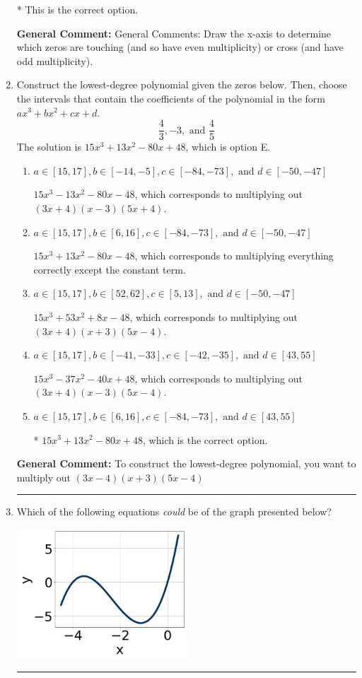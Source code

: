 \documentclass{extbook}[14pt]
\newcommand{\litem}[1]{\item #1

\rule{\textwidth}{0.4pt}}
\begin{document}
\begin{enumerate}
{\begin{enumerate}[label=\Alph*.]
* This is the correct option.
\end{enumerate}

\textbf{General Comment:} General Comments: Draw the x-axis to determine which zeros are touching (and so have even multiplicity) or cross (and have odd multiplicity).
}
\litem{
Construct the lowest-degree polynomial given the zeros below. Then, choose the intervals that contain the coefficients of the polynomial in the form $ax^3+bx^2+cx+d$.
\[ \frac{4}{3}, -3, \text{ and } \frac{4}{5} \]The solution is \( 15x^{3} +13 x^{2} -80 x + 48 \), which is option E.\begin{enumerate}[label=\Alph*.]
\item \( a \in [15, 17], b \in [-14, -5], c \in [-84, -73], \text{ and } d \in [-50, -47] \)

$15x^{3} -13 x^{2} -80 x -48$, which corresponds to multiplying out $(3x + 4)(x -3)(5x + 4)$.
\item \( a \in [15, 17], b \in [6, 16], c \in [-84, -73], \text{ and } d \in [-50, -47] \)

$15x^{3} +13 x^{2} -80 x -48$, which corresponds to multiplying everything correctly except the constant term.
\item \( a \in [15, 17], b \in [52, 62], c \in [5, 13], \text{ and } d \in [-50, -47] \)

$15x^{3} +53 x^{2} +8 x -48$, which corresponds to multiplying out $(3x + 4)(x + 3)(5x -4)$.
\item \( a \in [15, 17], b \in [-41, -33], c \in [-42, -35], \text{ and } d \in [43, 55] \)

$15x^{3} -37 x^{2} -40 x + 48$, which corresponds to multiplying out $(3x + 4)(x -3)(5x -4)$.
\item \( a \in [15, 17], b \in [6, 16], c \in [-84, -73], \text{ and } d \in [43, 55] \)

* $15x^{3} +13 x^{2} -80 x + 48$, which is the correct option.
\end{enumerate}

\textbf{General Comment:} To construct the lowest-degree polynomial, you want to multiply out $(3x -4)(x + 3)(5x -4)$
}
\litem{
Which of the following equations \textit{could} be of the graph presented below?

\begin{center}
    \includegraphics[width=0.5\textwidth]{../Figures/polyGraphToFunctionC.png}
\end{center}


}
\end{enumerate}
\end{document}
